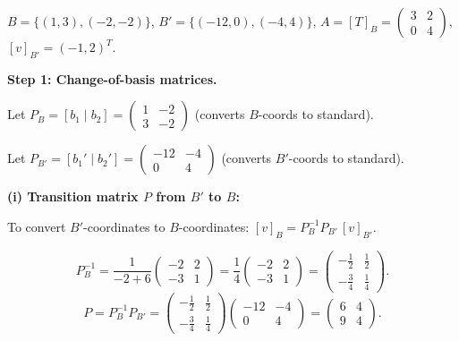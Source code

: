 \documentclass[12pt,a3paper]{article}
\begin{document}
\begin{tcolorbox}[enhanced,breakable,
  colback=cF!4,colframe=cF,boxrule=0.8pt,arc=5pt,
  title={\textbf{Answer --- Transition Matrices; $B,B'$; Matrix $A'$ Relative to $B'$}},
  fonttitle=\bfseries\color{white},colbacktitle=cF]

$B=\{(1,3),(-2,-2)\}$, $B'=\{(-12,0),(-4,4)\}$, $A=[T]_B=\begin{pmatrix}3&2\\0&4\end{pmatrix}$, $[v]_{B'}=(-1,2)^T$.

\textbf{Step 1: Change-of-basis matrices.}

Let $P_B=[b_1\mid b_2]=\begin{pmatrix}1&-2\\3&-2\end{pmatrix}$ (converts $B$-coords to standard).

Let $P_{B'}=[b_1'\mid b_2']=\begin{pmatrix}-12&-4\\0&4\end{pmatrix}$ (converts $B'$-coords to standard).

\textbf{(i) Transition matrix $P$ from $B'$ to $B$:}

To convert $B'$-coordinates to $B$-coordinates: $[v]_B = P_B^{-1}P_{B'}\,[v]_{B'}$.

\[
P_B^{-1}=\frac{1}{-2+6}\begin{pmatrix}-2&2\\-3&1\end{pmatrix}=\frac{1}{4}\begin{pmatrix}-2&2\\-3&1\end{pmatrix}
=\begin{pmatrix}-\frac{1}{2}&\frac{1}{2}\\-\frac{3}{4}&\frac{1}{4}\end{pmatrix}.
\]
\[
P=P_B^{-1}P_{B'}=\begin{pmatrix}-\frac{1}{2}&\frac{1}{2}\\-\frac{3}{4}&\frac{1}{4}\end{pmatrix}\begin{pmatrix}-12&-4\\0&4\end{pmatrix}=\begin{pmatrix}6&4\\9&4\end{pmatrix}.
\]


\end{tcolorbox}
\end{document}
